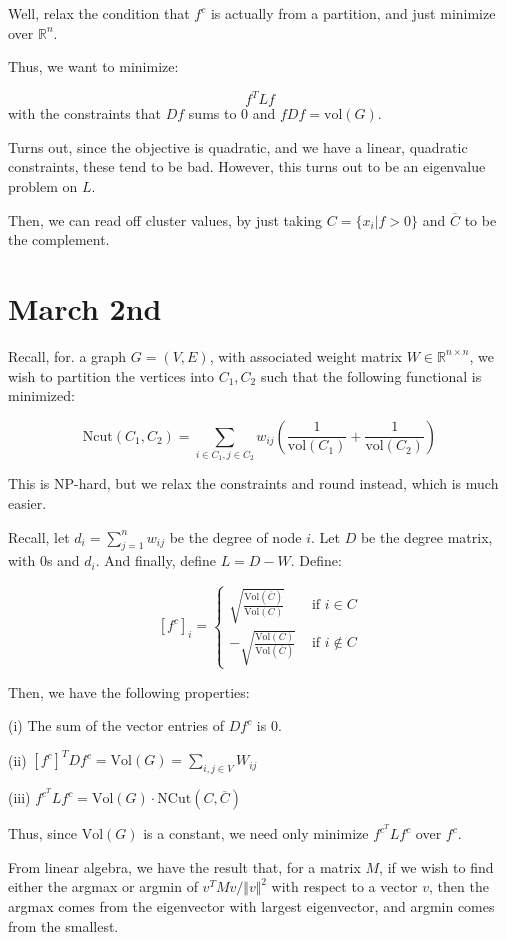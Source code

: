 \documentclass[10pt]{article}
\newcommand{\vol}{\text{Vol}}
\begin{document}
Well, relax the condition that $f^c$ is actually from a partition, and just minimize over $\mathbb{R}^n$.

Thus, we want to minimize:

$$f^TL f$$ with the constraints that $Df$ sums to 0 and $fDf = \text{vol}(G)$. 

Turns out, since the objective is quadratic, and we have a linear, quadratic constraints, these tend to be bad. However, this turns out to be an eigenvalue problem on $L$.

Then, we can read off cluster values, by just taking $C = \{ x_i | f > 0 \}$ and $\overline{C}$ to be the complement.

\section*{March 2nd}

Recall, for. a graph $G = (V,E)$, with associated weight matrix $W \in \mathbb{R}^{n \times n}$, we wish to partition the vertices into $C_1, C_2$ such that the following functional is minimized:

$$ \text{Ncut}(C_1,C_2) = \sum_{i \in C_1, j \in C_2} w_{ij} \left( \frac{1}{\text{vol}(C_1)} + \frac{1}{\text{vol}(C_2)} \right)$$

This is NP-hard, but we relax the constraints and round instead, which is much easier.

Recall, let $d_i = \sum_{j=1}^n w_{ij}$ be the degree of node $i$. Let $D$ be the degree matrix, with 0s and $d_i$. And finally, define $L = D - W$. Define:

$$ [f^c]_i = \begin{cases} \sqrt{\frac{\text{Vol}(\overline{C})}{\text{Vol}(C)}} & \text{ if } i \in C \\ -\sqrt{\frac{\text{Vol}(C)}{\text{Vol}(\overline{C})}} & \text{ if } i \not \in C \end{cases} $$

Then, we have the following properties:

(i) The sum of the vector entries of $D f^c$ is 0. 

(ii) $[f^c]^T D f^c = \text{Vol}(G) = \sum_{i,j \in V} W_{ij} $

(iii) $f^{c^T} L f^c = \text{Vol}(G) \cdot \text{NCut}(C, \overline{C}) $

Thus, since $\vol(G)$ is a constant, we need only minimize $f^{c^T} L f^c $ over $f^c$.

From linear algebra, we have the result that, for a matrix $M$, if we wish to find either the argmax or argmin of $v^T M v/ \Vert v \Vert^2$ with respect to a vector $v$, then the argmax comes from the eigenvector with largest eigenvector, and argmin comes from the smallest.
\end{document}
